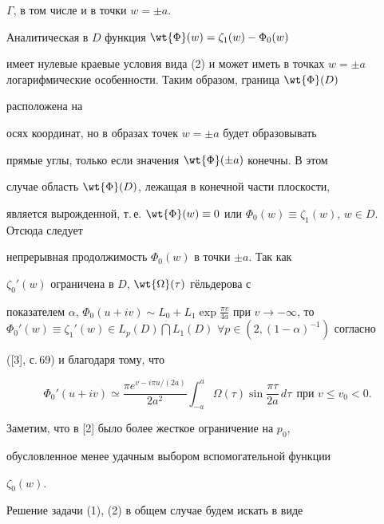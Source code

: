 \begin{pf}
$\Gamma$, в том числе и в точки $w = \pm a$.





Аналитическая в $D$ функция $\wt{\Phi}(w) = \zeta_1(w) - \Phi_0(w)$


имеет нулевые краевые условия вида (2) и может иметь в точках $w = \pm


a$ логарифмические особенности. Таким образом, граница $\wt{\Phi}(D)$


расположена на


осях координат, но в образах точек $w = \pm a$ будет образовывать


прямые углы, только если значения $\wt{\Phi}(\pm a)$ конечны. В этом


случае область $\wt{\Phi}(D)$, лежащая в конечной части плоскости,


является вырожденной, т.\,е. $\wt{\Phi}(w) \equiv 0$ или $\Phi_0(w)


\equiv \zeta_1(w)$, $w \in D$. Отсюда следует


непрерывная продолжимость $\Phi_0(w)$ в точки $\pm a$. Так как


$\zeta_0'(w)$ ограничена в $D$, $\wt{\Omega}(\tau)$ г\"ельдерова с


показателем $\alpha$, $\Phi_0 (u + iv) \sim L_0 + L_1 \exp \frac{\pi


v}{4a}$ при $v \to - \infty$, то $\Phi_0'(w) \equiv \zeta_1'(w) \in


L_p(D) \bigcap L_1(D)$ $\forall p \in (2, (1 - \alpha)^{-1})$ согласно


([3], с.\,69) и благодаря тому, что


$$


\Phi_0'(u + iv) \simeq \frac{\pi e^{v - i\pi u/(2a)}}{2 a^2}


\int_{-a}^a \Omega (\tau) \sin\frac{\pi \tau}{2a}\, d\tau


\ \ \text{при $v \leq v_0 < 0$}.


$$


Заметим, что в [2] было более жесткое ограничение на $p_0$,


обусловленное менее удачным выбором вспомогательной функции


$\zeta_0(w)$.





Решение задачи (1), (2) в общем случае будем искать в виде


\begin{equation}



\end{equation}
\end{pf}
